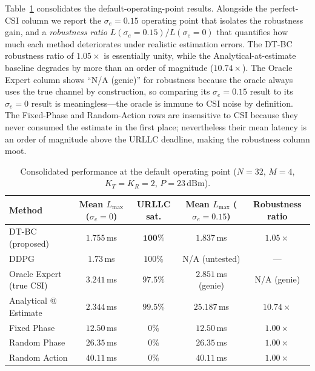 \documentclass[journal]{IEEEtran}
\begin{document}
Table~\ref{tab:results} consolidates the default-operating-point
results. Alongside the perfect-CSI column we report the
$\sigma_e\!=\!0.15$ operating point that isolates the robustness
gain, and a \emph{robustness ratio}
$L(\sigma_e\!=\!0.15)/L(\sigma_e\!=\!0)$ that quantifies how much
each method deteriorates under realistic estimation errors. The
DT-BC robustness ratio of $1.05\!\times$ is essentially unity,
while the Analytical-at-estimate baseline degrades by more than an
order of magnitude ($10.74\!\times$). The Oracle Expert column shows
``N/A (genie)'' for robustness because the oracle always uses the true
channel by construction, so comparing its $\sigma_e\!=\!0.15$ result
to its $\sigma_e\!=\!0$ result is meaningless---the oracle is immune
to CSI noise by definition. The Fixed-Phase and Random-Action rows are
insensitive to CSI because they never consumed the estimate in the
first place; nevertheless their mean latency is an order of
magnitude above the URLLC deadline, making the robustness column
moot.

\begin{table}[t]
\centering
\caption{Consolidated performance at the default operating point
($N\!=\!32$, $M\!=\!4$, $K_T\!=\!K_R\!=\!2$, $P\!=\!23\,\text{dBm}$).}
\label{tab:results}
\begin{tabular}{lcccc}
\toprule
\textbf{Method} &
\textbf{Mean $L_{\max}$} ($\sigma_e\!=\!0$) &
\textbf{URLLC sat.} &
\textbf{Mean $L_{\max}$} ($\sigma_e\!=\!0.15$) &
\textbf{Robustness ratio} \\
\midrule
DT-BC (proposed)          & $\mathbf{1.755}$\,ms & $\mathbf{100\%}$ & $\mathbf{1.837}$\,ms & $\mathbf{1.05\!\times}$\\
DDPG \cite{lillicrap2016continuous}
                          & $1.73$\,ms           & $100\%$          & N/A (untested)        & ---\\
Oracle Expert (true CSI)  & $3.241$\,ms          & $97.5\%$         & $2.851$\,ms (genie)   & N/A (genie)\\
Analytical @ Estimate     & $2.344$\,ms          & $99.5\%$         & $25.187$\,ms          & $10.74\!\times$\\
Fixed Phase               & $12.50$\,ms          & $0\%$            & $12.50$\,ms           & $1.00\!\times$\\
Random Phase              & $26.35$\,ms          & $0\%$            & $26.35$\,ms           & $1.00\!\times$\\
Random Action             & $40.11$\,ms          & $0\%$            & $40.11$\,ms           & $1.00\!\times$\\
\bottomrule
\end{tabular}
\end{table}
\end{document}
